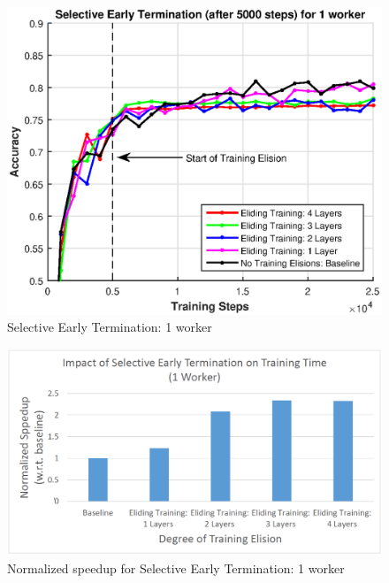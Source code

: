 \begin{figure}[t]
	\centering
	\includegraphics[width=0.8\columnwidth]{figures/fig6.eps}
	\caption{Selective Early Termination: 1 worker}
	\label{fig:fig6}
\end{figure}

\begin{figure}[t]
	\centering
	\includegraphics[width=0.8\columnwidth]{figures/fig7.PNG}
	\caption{Normalized speedup for Selective Early Termination: 1 worker}
	\label{fig:fig7}
\end{figure}
